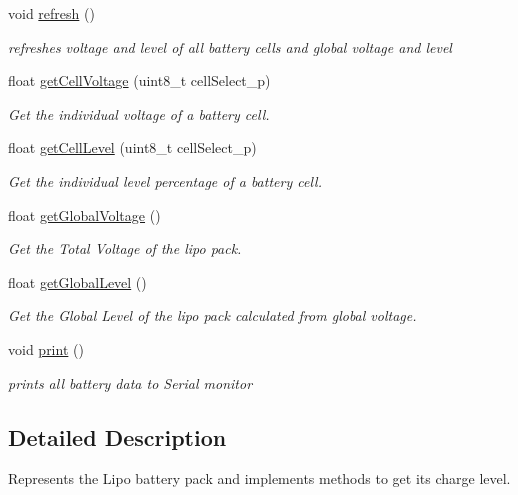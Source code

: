 \begin{DoxyCompactItemize}
\mbox{\label{class_battery_a7289442b8119494f06080d843c261c74}} 
void \hyperlink{class_battery_a7289442b8119494f06080d843c261c74}{refresh} ()
\begin{DoxyCompactList}\small\item\em refreshes voltage and level of all battery cells and global voltage and level \end{DoxyCompactList}\item 
float \hyperlink{class_battery_ae449209593f825ca7cefc958d51ba232}{get\+Cell\+Voltage} (uint8\+\_\+t cell\+Select\+\_\+p)
\begin{DoxyCompactList}\small\item\em Get the individual voltage of a battery cell. \end{DoxyCompactList}\item 
float \hyperlink{class_battery_a810c22577141039b044fdf59a9f9bdef}{get\+Cell\+Level} (uint8\+\_\+t cell\+Select\+\_\+p)
\begin{DoxyCompactList}\small\item\em Get the individual level percentage of a battery cell. \end{DoxyCompactList}\item 
float \hyperlink{class_battery_a288d5d3b5ebbe964751a9d64519aacdb}{get\+Global\+Voltage} ()
\begin{DoxyCompactList}\small\item\em Get the Total Voltage of the lipo pack. \end{DoxyCompactList}\item 
float \hyperlink{class_battery_a16e5bfb8a07ce93c08382fbcfb0b19be}{get\+Global\+Level} ()
\begin{DoxyCompactList}\small\item\em Get the Global Level of the lipo pack calculated from global voltage. \end{DoxyCompactList}\item 
void \hyperlink{class_battery_a66ad0266d08fe7d72c90d54654dffcea}{print} ()
\begin{DoxyCompactList}\small\item\em prints all battery data to Serial monitor \end{DoxyCompactList}\end{DoxyCompactItemize}


\subsection{Detailed Description}
Represents the Lipo battery pack and implements methods to get its charge level. 

